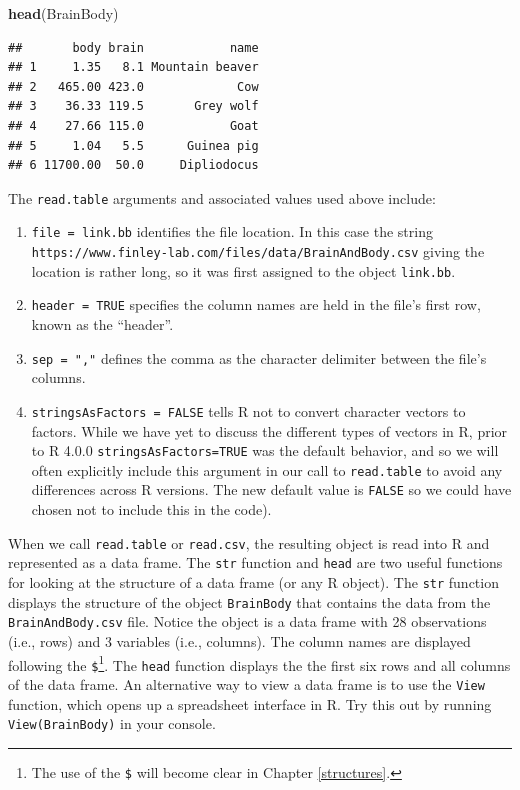 \documentclass[
]{krantz}
\newenvironment{Shaded}{\begin{snugshade}}{\end{snugshade}}
\newcommand{\KeywordTok}[1]{\textcolor[rgb]{0.13,0.29,0.53}{\textbf{#1}}}
\newcommand{\NormalTok}[1]{#1}
\providecommand{\tightlist}{%
  \setlength{\itemsep}{0pt}\setlength{\parskip}{0pt}}
\begin{document}
\begin{Shaded}
\begin{Highlighting}[]
\KeywordTok{head}\NormalTok{(BrainBody)}
\end{Highlighting}
\end{Shaded}

\begin{verbatim}
##       body brain            name
## 1     1.35   8.1 Mountain beaver
## 2   465.00 423.0             Cow
## 3    36.33 119.5       Grey wolf
## 4    27.66 115.0            Goat
## 5     1.04   5.5      Guinea pig
## 6 11700.00  50.0     Dipliodocus
\end{verbatim}

The \texttt{read.table} arguments and associated values used above include:

\begin{enumerate}
\def\labelenumi{\arabic{enumi}.}
\tightlist
\item
  \texttt{file\ =\ link.bb} identifies the file location. In this case the string \texttt{https://www.finley-lab.com/files/data/BrainAndBody.csv} giving the location is rather long, so it was first assigned to the object \texttt{link.bb}.
\item
  \texttt{header\ =\ TRUE} specifies the column names are held in the file's first row, known as the ``header''.
\item
  \texttt{sep\ =\ ","} defines the comma as the character delimiter between the file's columns.
\item
  \texttt{stringsAsFactors\ =\ FALSE} tells R not to convert character vectors to factors. While we have yet to discuss the different types of vectors in R, prior to R 4.0.0 \texttt{stringsAsFactors=TRUE} was the default behavior, and so we will often explicitly include this argument in our call to \texttt{read.table} to avoid any differences across R versions. The new default value is \texttt{FALSE} so we could have chosen not to include this in the code).
\end{enumerate}

When we call \texttt{read.table} or \texttt{read.csv}, the resulting object is read into R and represented as a data frame. The \texttt{str} function and \texttt{head} are two useful functions for looking at the structure of a data frame (or any R object). The \texttt{str} function displays the structure of the object \texttt{BrainBody} that contains the data from the \texttt{BrainAndBody.csv} file. Notice the object is a data frame with 28 observations (i.e., rows) and 3 variables (i.e., columns). The column names are displayed following the \texttt{\$}\footnote{The use of the \texttt{\$} will become clear in Chapter \ref{structures}.}. The \texttt{head} function displays the the first six rows and all columns of the data frame. An alternative way to view a data frame is to use the \texttt{View} function, which opens up a spreadsheet interface in R. Try this out by running \texttt{View(BrainBody)} in your console.
\end{document}
